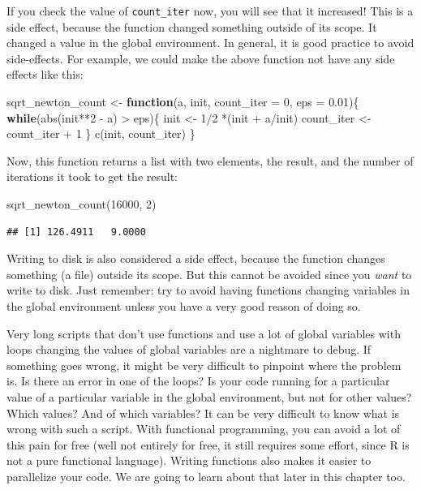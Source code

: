 \documentclass[
]{article}
\newenvironment{Shaded}{\begin{snugshade}}{\end{snugshade}}
\newcommand{\AttributeTok}[1]{\textcolor[rgb]{0.77,0.63,0.00}{#1}}
\newcommand{\ControlFlowTok}[1]{\textcolor[rgb]{0.13,0.29,0.53}{\textbf{#1}}}
\newcommand{\DecValTok}[1]{\textcolor[rgb]{0.00,0.00,0.81}{#1}}
\newcommand{\FloatTok}[1]{\textcolor[rgb]{0.00,0.00,0.81}{#1}}
\newcommand{\FunctionTok}[1]{\textcolor[rgb]{0.00,0.00,0.00}{#1}}
\newcommand{\NormalTok}[1]{#1}
\newcommand{\OtherTok}[1]{\textcolor[rgb]{0.56,0.35,0.01}{#1}}
\newcommand{\SpecialCharTok}[1]{\textcolor[rgb]{0.00,0.00,0.00}{#1}}
\begin{document}
If you check the value of \texttt{count\_iter} now, you will see that it increased! This is a side effect,
because the function changed something outside of its scope. It changed a value in the global
environment. In general, it is good practice to avoid side-effects. For example, we could make the
above function not have any side effects like this:

\begin{Shaded}
\begin{Highlighting}[]
\NormalTok{sqrt\_newton\_count }\OtherTok{\textless{}{-}} \ControlFlowTok{function}\NormalTok{(a, init, }\AttributeTok{count\_iter =} \DecValTok{0}\NormalTok{, }\AttributeTok{eps =} \FloatTok{0.01}\NormalTok{)\{}
    \ControlFlowTok{while}\NormalTok{(}\FunctionTok{abs}\NormalTok{(init}\SpecialCharTok{**}\DecValTok{2} \SpecialCharTok{{-}}\NormalTok{ a) }\SpecialCharTok{\textgreater{}}\NormalTok{ eps)\{}
\NormalTok{        init }\OtherTok{\textless{}{-}} \DecValTok{1}\SpecialCharTok{/}\DecValTok{2} \SpecialCharTok{*}\NormalTok{(init }\SpecialCharTok{+}\NormalTok{ a}\SpecialCharTok{/}\NormalTok{init)}
\NormalTok{        count\_iter }\OtherTok{\textless{}{-}}\NormalTok{ count\_iter }\SpecialCharTok{+} \DecValTok{1}
\NormalTok{    \}}
    \FunctionTok{c}\NormalTok{(init, count\_iter)}
\NormalTok{\}}
\end{Highlighting}
\end{Shaded}

Now, this function returns a list with two elements, the result, and the number of iterations it
took to get the result:

\begin{Shaded}
\begin{Highlighting}[]
\FunctionTok{sqrt\_newton\_count}\NormalTok{(}\DecValTok{16000}\NormalTok{, }\DecValTok{2}\NormalTok{)}
\end{Highlighting}
\end{Shaded}

\begin{verbatim}
## [1] 126.4911   9.0000
\end{verbatim}

Writing to disk is also considered a side effect, because the function changes something (a file)
outside its scope. But this cannot be avoided since you \emph{want} to write to disk.
Just remember: try to avoid having functions changing variables in the global environment unless
you have a very good reason of doing so.

Very long scripts that don't use functions and use a lot of global variables with loops changing
the values of global variables are a nightmare to debug. If something goes wrong, it might be very
difficult to pinpoint where the problem is. Is there an error in one of the loops?
Is your code running for a particular value of a particular variable in the global environment, but
not for other values? Which values? And of which variables? It can be very difficult to know what
is wrong with such a script.
With functional programming, you can avoid a lot of this pain for free (well not entirely for free,
it still requires some effort, since R is not a pure functional language). Writing functions also
makes it easier to parallelize your code. We are going to learn about that later in this chapter too.
\end{document}
